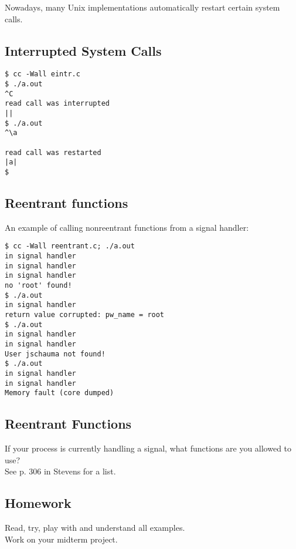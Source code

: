 \documentclass[xga]{xdvislides}
\begin{document}
Nowadays, many Unix implementations automatically restart certain system
calls.

\subsection{Interrupted System Calls}
\begin{verbatim}
$ cc -Wall eintr.c
$ ./a.out
^C
read call was interrupted
||
$ ./a.out
^\a

read call was restarted
|a|
$
\end{verbatim}

\subsection{Reentrant functions}
An example of calling nonreentrant functions from a signal handler:
\begin{verbatim}
$ cc -Wall reentrant.c; ./a.out
in signal handler
in signal handler
in signal handler
no 'root' found!
$ ./a.out
in signal handler
return value corrupted: pw_name = root
$ ./a.out
in signal handler
in signal handler
User jschauma not found!
$ ./a.out
in signal handler
in signal handler
Memory fault (core dumped)
\end{verbatim}

\subsection{Reentrant Functions}

If your process is currently handling a signal, what functions are you allowed
to use? \\

See p. 306 in Stevens for a list.


\subsection{Homework}

Read, try, play with and understand all examples. \\

Work on your midterm project.
\end{document}
